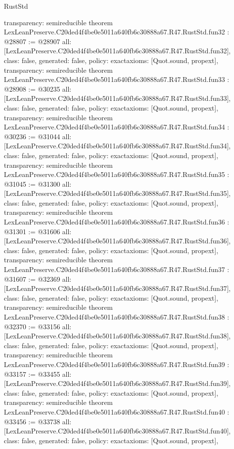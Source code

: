 \begin{lexlean}{RustStd}
\begin{coremodule}
{  transparency: semireducible
}
theorem LexLeanPreserve.C20ded4f4be0e5011a640fb6c30888a67.R47.RustStd.fun32 : @28807 := @28907 {
  all: [LexLeanPreserve.C20ded4f4be0e5011a640fb6c30888a67.R47.RustStd.fun32],
  class: false,
  generated: false,
  policy: exact{axioms: [Quot.sound, propext]},
  transparency: semireducible
}
theorem LexLeanPreserve.C20ded4f4be0e5011a640fb6c30888a67.R47.RustStd.fun33 : @28908 := @30235 {
  all: [LexLeanPreserve.C20ded4f4be0e5011a640fb6c30888a67.R47.RustStd.fun33],
  class: false,
  generated: false,
  policy: exact{axioms: [Quot.sound, propext]},
  transparency: semireducible
}
theorem LexLeanPreserve.C20ded4f4be0e5011a640fb6c30888a67.R47.RustStd.fun34 : @30236 := @31044 {
  all: [LexLeanPreserve.C20ded4f4be0e5011a640fb6c30888a67.R47.RustStd.fun34],
  class: false,
  generated: false,
  policy: exact{axioms: [Quot.sound, propext]},
  transparency: semireducible
}
theorem LexLeanPreserve.C20ded4f4be0e5011a640fb6c30888a67.R47.RustStd.fun35 : @31045 := @31300 {
  all: [LexLeanPreserve.C20ded4f4be0e5011a640fb6c30888a67.R47.RustStd.fun35],
  class: false,
  generated: false,
  policy: exact{axioms: [Quot.sound, propext]},
  transparency: semireducible
}
theorem LexLeanPreserve.C20ded4f4be0e5011a640fb6c30888a67.R47.RustStd.fun36 : @31301 := @31606 {
  all: [LexLeanPreserve.C20ded4f4be0e5011a640fb6c30888a67.R47.RustStd.fun36],
  class: false,
  generated: false,
  policy: exact{axioms: [Quot.sound, propext]},
  transparency: semireducible
}
theorem LexLeanPreserve.C20ded4f4be0e5011a640fb6c30888a67.R47.RustStd.fun37 : @31607 := @32369 {
  all: [LexLeanPreserve.C20ded4f4be0e5011a640fb6c30888a67.R47.RustStd.fun37],
  class: false,
  generated: false,
  policy: exact{axioms: [Quot.sound, propext]},
  transparency: semireducible
}
theorem LexLeanPreserve.C20ded4f4be0e5011a640fb6c30888a67.R47.RustStd.fun38 : @32370 := @33156 {
  all: [LexLeanPreserve.C20ded4f4be0e5011a640fb6c30888a67.R47.RustStd.fun38],
  class: false,
  generated: false,
  policy: exact{axioms: [Quot.sound, propext]},
  transparency: semireducible
}
theorem LexLeanPreserve.C20ded4f4be0e5011a640fb6c30888a67.R47.RustStd.fun39 : @33157 := @33455 {
  all: [LexLeanPreserve.C20ded4f4be0e5011a640fb6c30888a67.R47.RustStd.fun39],
  class: false,
  generated: false,
  policy: exact{axioms: [Quot.sound, propext]},
  transparency: semireducible
}
theorem LexLeanPreserve.C20ded4f4be0e5011a640fb6c30888a67.R47.RustStd.fun40 : @33456 := @33738 {
  all: [LexLeanPreserve.C20ded4f4be0e5011a640fb6c30888a67.R47.RustStd.fun40],
  class: false,
  generated: false,
  policy: exact{axioms: [Quot.sound, propext]},
}
\end{coremodule}
\end{lexlean}

